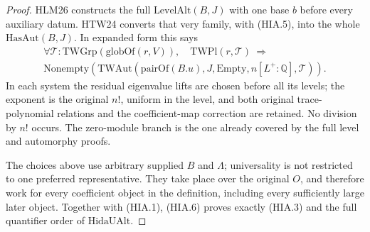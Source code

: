 \documentclass[11pt,a4paper]{article}
\numberwithin{equation}{section}
\theoremstyle{remark}\newtheorem{remark}[theorem]{Remark}
\begin{document}
\begin{proof}
HLM26 constructs the full \(\mathrm{LevelAlt}(B,J)\) with
one base \(b\) before every auxiliary datum.  HTW24 converts
that very family, with (HIA.5), into the whole
\(\mathrm{HasAut}(B,J)\).  In expanded form this says
\[
 \begin{gathered}
 \forall\mathcal T:\mathrm{TWGrp}(\mathrm{globOf}(r,V)),
 \quad\mathrm{TWPl}(r,\mathcal T)
 \ \Longrightarrow\\
 \mathrm{Nonempty}\!\left(
 \mathrm{TWAut}(\mathrm{pairOf}(B.u),J,\mathrm{Empty},
                   n[L^+:\mathbb Q],\mathcal T)\right).
 \end{gathered}
 \tag{HIA.6}
\]
In each system the residual eigenvalue lifts are chosen before
all its levels; the exponent is the original \(n!\), uniform
in the level, and both original trace-polynomial relations
and the coefficient-map correction are retained.  No
division by \(n!\) occurs.  The zero-module branch is the
one already covered by the full level and automorphy proofs.

The choices above use arbitrary supplied \(B\) and
\(\Lambda\); universality is not restricted to one preferred
representative.  They take place over the original \(O\),
and therefore work for every coefficient object in the
definition, including every sufficiently large later object.
Together with (HIA.1), (HIA.6) proves exactly (HIA.3) and
the full quantifier order of \(\mathrm{HidaUAlt}\).
\end{proof}

\end{document}
